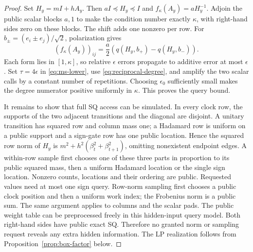 \begin{proof}
Set $H_y=mI+hA_y$. Then $aI\preceq H_y\preceq I$ and
$f_\kappa(A_y)=aH_y^{-1}$. Adjoin the public scalar blocks $a,1$ to make
the condition number exactly $\kappa$, with right-hand sides zero on
these blocks. The shift adds one nonzero per row. For
$b_\pm=(e_i\pm e_j)/\sqrt2$, polarization gives
\[
 (f_\kappa(A_y))_{ij}=\frac a2(q(H_y,b_+)-q(H_y,b_-)).
\]
Each form lies in $[1,\kappa]$, so relative $\epsilon$ errors propagate
to additive error at most $\epsilon$. Set $\tau=4\epsilon$ in
\eqref{eq:ms-lower}, use \eqref{eq:reciprocal-degree}, and amplify the
two scalar calls by a constant number of repetitions. Choosing
$\epsilon_0$ sufficiently small makes the degree numerator positive
uniformly in $\kappa$. This proves the query bound.

It remains to show that full SQ access can be simulated. In every clock
row, the
supports of the two adjacent transitions and the diagonal are disjoint.
A unitary transition has squared row and column mass one; a Hadamard
row is uniform on a public support and a sign-gate row has one public
location. Hence the squared row norm of $H_y$ is
$m^2+h^2(\beta_t^2+\beta_{t+1}^2)$, omitting nonexistent endpoint edges.
A within-row sample first chooses one of these three parts in
proportion to its public squared mass, then a uniform Hadamard location
or the single sign location. Nonzero counts,
locations and their ordering are public. Requested values need at most
one sign query. Row-norm sampling first chooses a public clock position
and then a uniform work index; the Frobenius norm is a public sum.
The same argument applies to columns and the scalar pads. The public
weight table can be preprocessed freely in this hidden-input query
model. Both right-hand sides have public exact SQ. Therefore no granted
norm or sampling request reveals any extra hidden information.
The LP realization follows from Proposition~\ref{prop:box-factor} below.
\end{proof}

